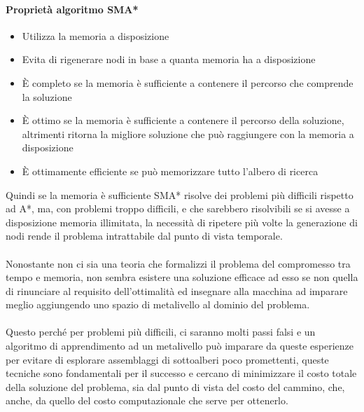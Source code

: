 \documentclass[../main.tex]{subfiles}
\begin{document}
	\paragraph{Proprietà algoritmo SMA*}
	\begin{itemize}
		\item Utilizza la memoria a disposizione
		\item Evita di rigenerare nodi in base a quanta memoria ha a disposizione
		\item È completo se la memoria è sufficiente a contenere il percorso che comprende la soluzione
		\item È ottimo se la memoria è sufficiente a contenere il percorso della soluzione, altrimenti ritorna la migliore soluzione che può raggiungere con la memoria a disposizione
		\item È ottimamente efficiente se può memorizzare tutto l’albero di ricerca
	\end{itemize}
	Quindi se la memoria è sufficiente SMA* risolve dei problemi più difficili rispetto ad A*, ma, con problemi troppo difficili, e che sarebbero risolvibili se si avesse a disposizione memoria illimitata, la necessità di ripetere più volte la generazione di nodi rende il problema intrattabile dal punto di vista temporale.\\ \\
	Nonostante non ci sia una teoria che formalizzi il problema del compromesso tra tempo e memoria, non sembra esistere una soluzione efficace ad esso se non quella di rinunciare al requisito dell’ottimalità ed insegnare alla macchina ad imparare meglio aggiungendo uno spazio di metalivello al dominio del problema.\\ \\
	Questo perché per problemi più difficili, ci saranno molti passi falsi e un algoritmo di apprendimento ad un metalivello può imparare da queste esperienze per evitare di esplorare assemblaggi di sottoalberi poco promettenti, queste tecniche sono fondamentali per il successo e cercano di minimizzare il costo totale della soluzione del problema, sia dal punto di vista del costo del cammino, che, anche, da quello del costo computazionale che serve per ottenerlo.
\end{document}
